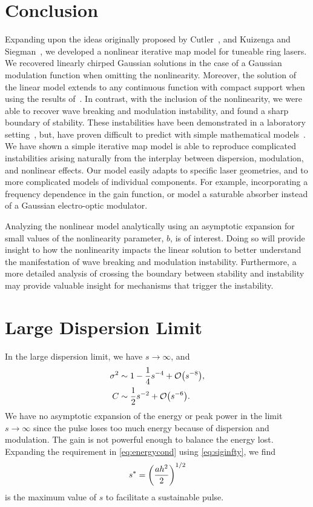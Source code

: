 \documentclass[9pt,twocolumn,twoside]{osajnl}
\let\originalleft\left
\let\originalright\right
\renewcommand{\left}{\mathopen{}\mathclose\bgroup\originalleft}
\renewcommand{\right}{\aftergroup\egroup\originalright}
\providecommand{\bigO}[1]{\ensuremath{\mathop{}\mathopen{}\mathcal{O}\mathopen{}\left(#1\right)}} %
\begin{document}
\section{Conclusion}
\label{sec:conclusion}
Expanding upon the ideas originally proposed by Cutler~\cite{cutler1955}, and Kuizenga and Siegman~\cite{kuizenga1970, kuizenga1970a, siegman1969}, we developed a nonlinear iterative map model for tuneable ring lasers. We recovered linearly chirped Gaussian solutions in the case of a Gaussian modulation function when omitting the nonlinearity. Moreover, the solution of the linear model extends to any continuous function with compact support when using the results of~\cite{calcaterra2008a}. In contrast, with the inclusion of the nonlinearity, we were able to recover wave breaking and modulation instability, and found a sharp boundary of stability. These instabilities have been demonstrated in a laboratory setting~\cite{agrawal2013, anderson1992, finot2008, rothenberg1989b, tomlinson1985}, but, have proven difficult to predict with simple mathematical models~\cite{meng2020}. We have shown a simple iterative map model is able to reproduce complicated instabilities arising naturally from the interplay between dispersion, modulation, and nonlinear effects. Our model easily adapts to specific laser geometries, and to more complicated models of individual components. For example, incorporating a frequency dependence in the gain function, or model a saturable absorber instead of a Gaussian electro-optic modulator.

Analyzing the nonlinear model analytically using an asymptotic expansion for small values of the nonlinearity parameter, $b$, is of interest. Doing so will provide insight to how the nonlinearity impacts the linear solution to better understand the manifestation of wave breaking and modulation instability. Furthermore, a more detailed analysis of crossing the boundary between stability and instability may provide valuable insight for mechanisms that trigger the instability.

\appendix
\section{Large Dispersion Limit}
\label{sec:largedisp}
In the large dispersion limit, we have $s \rightarrow \infty$, and
\begin{align}
	\sigma^2 &\sim 1 - \frac{1}{4}s^{-4} + \bigO{s^{-8}}, \label{eq:siginfty} \\
	C &\sim \frac{1}{2}s^{-2} + \bigO{s^{-6}}.
\end{align}
We have no asymptotic expansion of the energy or peak power in the limit $s \rightarrow \infty$ since the pulse loses too much energy because of dispersion and modulation. The gain is not powerful enough to balance the energy lost. Expanding the requirement in \eqref{eq:energycond} using \eqref{eq:siginfty}, we find 
\begin{align}
	s^* = \left( \frac{a h^2}{2} \right)^{1/2}
	\label{eq:maxs}
\end{align}
is the maximum value of $s$ to facilitate a sustainable pulse.
\end{document}
